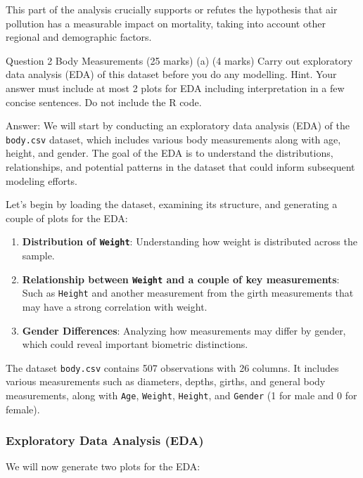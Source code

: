 \documentclass[
]{article}
\providecommand{\tightlist}{%
  \setlength{\itemsep}{0pt}\setlength{\parskip}{0pt}}
\begin{document}
This part of the analysis crucially supports or refutes the hypothesis
that air pollution has a measurable impact on mortality, taking into
account other regional and demographic factors.

Question 2 Body Measurements (25 marks) (a) (4 marks) Carry out
exploratory data analysis (EDA) of this dataset before you do any
modelling. Hint. Your answer must include at most 2 plots for EDA
including interpretation in a few concise sentences. Do not include the
R code.

Answer: We will start by conducting an exploratory data analysis (EDA)
of the \texttt{body.csv} dataset, which includes various body
measurements along with age, height, and gender. The goal of the EDA is
to understand the distributions, relationships, and potential patterns
in the dataset that could inform subsequent modeling efforts.

Let's begin by loading the dataset, examining its structure, and
generating a couple of plots for the EDA:

\begin{enumerate}
\def\labelenumi{\arabic{enumi}.}
\tightlist
\item
  \textbf{Distribution of \texttt{Weight}}: Understanding how weight is
  distributed across the sample.
\item
  \textbf{Relationship between \texttt{Weight} and a couple of key
  measurements}: Such as \texttt{Height} and another measurement from
  the girth measurements that may have a strong correlation with weight.
\item
  \textbf{Gender Differences}: Analyzing how measurements may differ by
  gender, which could reveal important biometric distinctions.
\end{enumerate}

The dataset \texttt{body.csv} contains 507 observations with 26 columns.
It includes various measurements such as diameters, depths, girths, and
general body measurements, along with \texttt{Age}, \texttt{Weight},
\texttt{Height}, and \texttt{Gender} (1 for male and 0 for female).

\hypertarget{exploratory-data-analysis-eda}{%
\subsubsection{Exploratory Data Analysis
(EDA)}\label{exploratory-data-analysis-eda}}

We will now generate two plots for the EDA:
\end{document}
